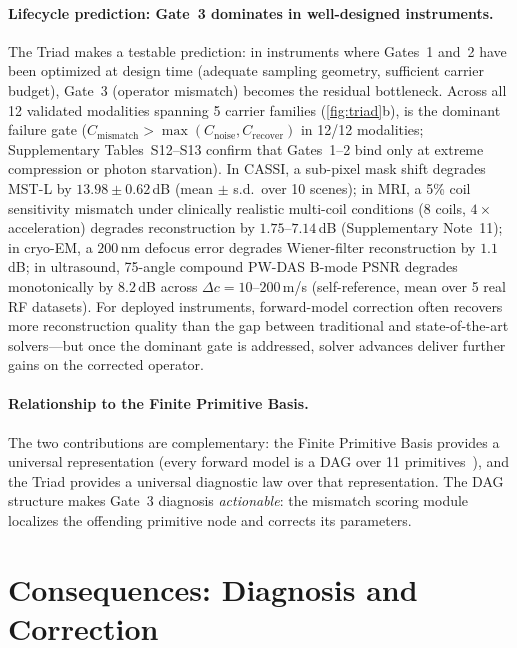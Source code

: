 \paragraph{Lifecycle prediction: Gate~3 dominates in well-designed instruments.}
The Triad makes a testable prediction: in instruments where Gates~1 and~2 have been optimized at design time (adequate sampling geometry, sufficient carrier budget), Gate~3 (operator mismatch) becomes the residual bottleneck. Across all 12 validated modalities spanning 5 carrier families (\cref{fig:triad}b), \gatethree{} is the dominant failure gate ($C_{\mathrm{mismatch}} > \max(C_{\mathrm{noise}}, C_{\mathrm{recover}})$ in 12/12 modalities; Supplementary Tables~S12--S13 confirm that Gates~1--2 bind only at extreme compression or photon starvation). In CASSI, a sub-pixel mask shift degrades MST-L by $13.98 \pm 0.62$\,dB (mean $\pm$ s.d.\ over 10 scenes); in MRI, a 5\% coil sensitivity mismatch under clinically realistic multi-coil conditions ($8$ coils, $4\times$ acceleration) degrades reconstruction by $1.75$--$7.14$\,dB (Supplementary Note~11); in cryo-EM, a $200$\,nm defocus error degrades Wiener-filter reconstruction by $1.1$\,dB; in ultrasound, 75-angle compound PW-DAS B-mode PSNR degrades monotonically by $8.2$\,dB across $\Delta c = 10$--$200$\,m/s (self-reference, mean over 5 real RF datasets). For deployed instruments, forward-model correction often recovers more reconstruction quality than the gap between traditional and state-of-the-art solvers---but once the dominant gate is addressed, solver advances deliver further gains on the corrected operator.

\paragraph{Relationship to the Finite Primitive Basis.}
The two contributions are complementary: the Finite Primitive Basis provides a universal representation (every forward model is a DAG over 11 primitives~\cite{yang2026fpt}), and the Triad provides a universal diagnostic law over that representation. The DAG structure makes Gate~3 diagnosis \emph{actionable}: the mismatch scoring module localizes the offending primitive node and corrects its parameters.



\FloatBarrier
\section*{Consequences: Diagnosis and Correction}

